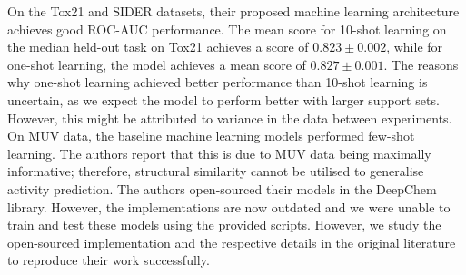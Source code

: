 On the Tox21 and SIDER datasets, their proposed machine learning architecture achieves good ROC-AUC performance. The mean score for 10-shot learning on the median held-out task on Tox21 achieves a score of $0.823 \pm 0.002$, while for one-shot learning, the model achieves a mean score of $0.827 \pm 0.001$. The reasons why one-shot learning achieved better performance than 10-shot learning is uncertain, as we expect the model to perform better with larger support sets. However, this might be attributed to variance in the data between experiments. On MUV data, the baseline machine learning models performed few-shot learning. The authors report that this is due to MUV data being maximally informative; therefore, structural similarity cannot be utilised to generalise activity prediction. The authors open-sourced their models in the DeepChem library\citep{ramsundar2019deep}. However, the implementations are now outdated and we were unable to train and test these models using the provided scripts. However, we study the open-sourced implementation and the respective details in the original literature to reproduce their work successfully.

